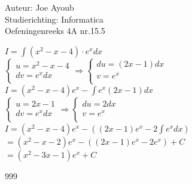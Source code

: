 \documentclass[a4paper]{article}
\begin{document}
  
\noindent \large Auteur: Joe Ayoub \\
\noindent \large Studierichting: Informatica\\
\noindent \large Oefeningenreeks 4A nr.15.5 \\

\medskip

\normalsize

$I = \displaystyle\int (x^2 - x - 4)\cdot e^x dx $ \\

$\left\{
\begin{array}{l}
	u = x^2-x-4 \\
	dv = e^xdx \\
\end{array}
\right . 
\Rightarrow
\left\{
\begin{array}{l}
	du = (2x-1)dx \\
	v = e^x \\
\end{array}
\right . $ \\

$I = (x^2-x-4)e^x - \displaystyle\int e^x(2x-1)dx$ \\

$\left\{
\begin{array}{l}
	u = 2x-1 \\
	dv = e^xdx \\
\end{array}
\right .
\Rightarrow
\left\{
\begin{array}{l}
	du = 2dx \\ 
	v = e^x \\
\end{array}
\right . $ \\

$I = (x^2-x-4)e^x - \left((2x-1)e^x-2\displaystyle\int e^xdx \right)$ \\

$= (x^2-x-2)e^x - ((2x-1)e^x-2e^x) + C$ \\

$= (x^2-3x-1)e^x  + C$ \\


\begin{thebibliography}{999}
\end{thebibliography}
\end{document}
